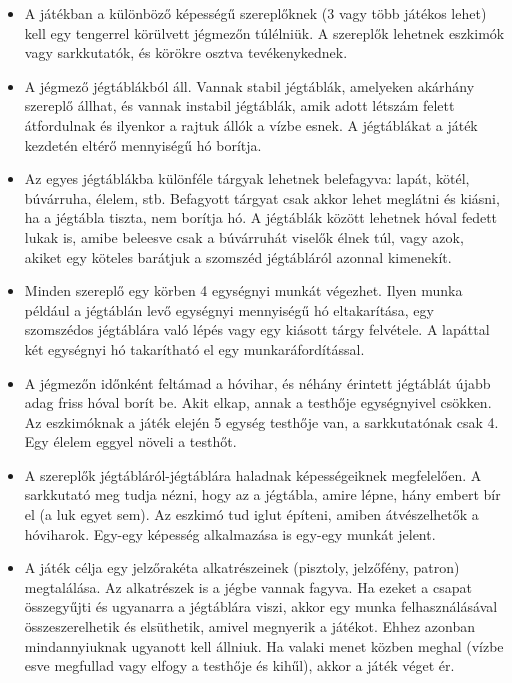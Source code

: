 \begin{itemize}
\item A játékban a különböző képességű szereplőknek (3 vagy több játékos lehet) kell egy tengerrel körülvett jégmezőn túlélniük. A szereplők lehetnek eszkimók vagy sarkkutatók, és körökre osztva tevékenykednek.

\item A jégmező jégtáblákból áll. Vannak stabil jégtáblák, amelyeken akárhány szereplő állhat, és vannak instabil jégtáblák, amik adott létszám felett átfordulnak és ilyenkor a rajtuk állók a vízbe esnek. A jégtáblákat a játék kezdetén eltérő mennyiségű hó borítja.

\item Az egyes jégtáblákba különféle tárgyak lehetnek belefagyva: lapát, kötél, búvárruha, élelem, stb. Befagyott tárgyat csak akkor lehet meglátni és kiásni, ha a jégtábla tiszta, nem borítja hó. A jégtáblák között lehetnek hóval fedett lukak is, amibe beleesve csak a búvárruhát viselők élnek túl, vagy azok, akiket egy köteles barátjuk a szomszéd jégtábláról azonnal kimenekít.

\item Minden szereplő egy körben 4 egységnyi munkát végezhet. Ilyen munka például a jégtáblán levő egységnyi mennyiségű hó eltakarítása, egy szomszédos jégtáblára való lépés vagy egy kiásott tárgy felvétele. A lapáttal két egységnyi hó takarítható el egy munkaráfordítással.

\item A jégmezőn időnként feltámad a hóvihar, és néhány érintett jégtáblát újabb adag friss hóval borít be. Akit elkap, annak a testhője egységnyivel csökken. Az eszkimóknak a játék elején 5 egység testhője van, a sarkkutatónak csak 4. Egy élelem eggyel növeli a testhőt.

\item A szereplők jégtábláról-jégtáblára haladnak képességeiknek megfelelően. A sarkkutató meg tudja nézni, hogy az a jégtábla, amire lépne, hány embert bír el (a luk egyet sem). Az eszkimó tud iglut építeni, amiben átvészelhetők a hóviharok. Egy-egy képesség alkalmazása is egy-egy munkát jelent.

\item A játék célja egy jelzőrakéta alkatrészeinek (pisztoly, jelzőfény, patron) megtalálása. Az alkatrészek is a jégbe vannak fagyva. Ha ezeket a csapat összegyűjti és ugyanarra a jégtáblára viszi, akkor egy munka felhasználásával összeszerelhetik és elsüthetik, amivel megnyerik a játékot. Ehhez azonban mindannyiuknak ugyanott kell állniuk. Ha valaki menet közben meghal (vízbe esve megfullad vagy elfogy a testhője és kihűl), akkor a játék véget ér. 
\end{itemize}

